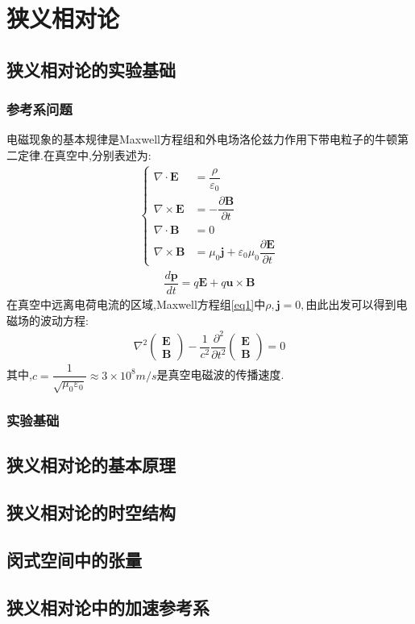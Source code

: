 \chapter{狭义相对论}
\section{狭义相对论的实验基础}
\subsection{参考系问题}
电磁现象的基本规律是Maxwell方程组和外电场洛伦兹力作用下带电粒子的牛顿第二定律.在真空中,分别表述为:
\begin{align}\label{eq1}
    \left\{
        \begin{aligned}
            \nabla \cdot \boldsymbol{E}&=\dfrac{\rho}{\varepsilon_0}\\
            \nabla \times \boldsymbol{E}&=-\dfrac{\partial \boldsymbol{B}}{\partial t}\\
            \nabla \cdot \boldsymbol{B}&=0\\
            \nabla \times \boldsymbol{B}&=\mu_0 \boldsymbol{j}+\varepsilon_0 \mu_0\dfrac{\partial \boldsymbol{E}}{\partial t}
        \end{aligned}
    \right.
\end{align}
\begin{align}
\dfrac{d\boldsymbol{p}}{dt}=q\boldsymbol{E}+q\boldsymbol{u}\times \boldsymbol{B}
\end{align}
在真空中远离电荷电流的区域,Maxwell方程组\ref{eq1}中$\rho,\boldsymbol{j}=0,$由此出发可以得到电磁场的波动方程:
\begin{align}
\nabla ^2 \begin{pmatrix} \boldsymbol{E} \\ \boldsymbol{B} \end{pmatrix}
-\dfrac{1}{c^2}\dfrac{\partial ^2}{\partial t^2}   \begin{pmatrix} \boldsymbol{E} \\ \boldsymbol{B} \end{pmatrix} =0
\end{align}
其中,$c=\dfrac{1}{\sqrt{\mu_0\varepsilon_0}}\approx 3 \times 10^8 m/s$是真空电磁波的传播速度.
\subsection{实验基础}
\section{狭义相对论的基本原理}
\section{狭义相对论的时空结构}
\section{闵式空间中的张量}
\section{狭义相对论中的加速参考系}